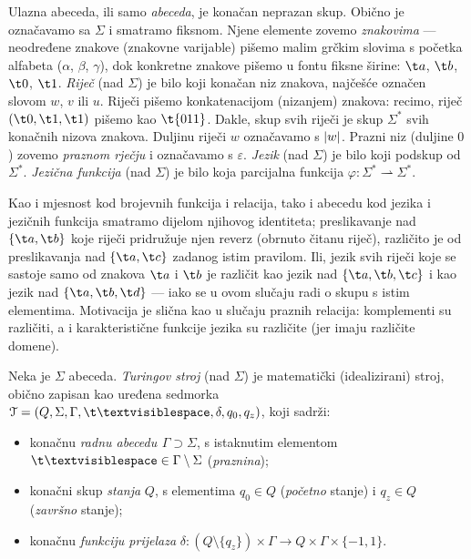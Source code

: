 Ulazna abeceda, ili samo \emph{abeceda}, je konačan neprazan skup. Obično je označavamo sa $\Sigma$ i smatramo fiksnom. Njene elemente zovemo \emph{znakovima} --- ne\-od\-re\-đe\-ne znakove (znakovne varijable) pišemo malim grčkim slovima s početka alfabeta ($\alpha$, $\beta$, $\gamma$), dok konkretne znakove pišemo u fontu fiksne širine: $\t a$, $\t b$, $\t 0$, $\t 1$. \emph{Riječ} (nad $\Sigma$) je bilo koji konačan niz znakova, najčešće označen slovom $w$, $v$ ili $u$. Riječi pišemo konkatenacijom (nizanjem) znakova: recimo, riječ $(\t0,\t1,\t1)$ pišemo kao $\t{011}$. Dakle, skup svih riječi je skup $\Sigma^*$ svih konačnih nizova znakova. Duljinu riječi $w$ označavamo s $\lvert w\rvert$. Prazni niz (duljine $0$) zovemo \emph{praznom rječju} i označavamo s $\varepsilon$. \emph{Jezik} (nad $\Sigma$) je bilo koji podskup od $\Sigma^*$. \emph{Jezična funkcija} (nad $\Sigma$) je bilo koja parcijalna funkcija $\varphi:\Sigma^*\rightharpoonup\Sigma^*$.

\begin{napomena}[{name=[abeceda je dio identiteta jezične funkcije]}]
Kao i mjesnost kod brojevnih funkcija i relacija, tako i abecedu kod jezika i jezičnih funkcija smatramo dijelom njihovog identiteta; preslikavanje nad $\{\t a,\t b\}$ koje riječi pridružuje njen reverz (obrnuto čitanu riječ), različito je od preslikavanja nad $\{\t a,\t c\}$ zadanog istim pravilom. Ili, jezik svih riječi koje se sastoje samo od znakova $\t a$ i $\t b$ je različit kao jezik nad $\{\t a,\t b,\t c\}$ i kao jezik nad $\{\t a,\t b,\t d\}$ --- iako se u ovom slučaju radi o skupu s istim elementima. Motivacija je slična kao u slučaju praznih relacija: komplementi su različiti, a i karakteristične funkcije jezika su različite (jer imaju različite domene).
\end{napomena}

\begin{definicija}[{name=[Turingov stroj]}]
Neka je $\Sigma$ abeceda. \emph{Turingov stroj} (nad $\Sigma$) je matematički (idealizirani) stroj, obično zapisan kao uređena sedmorka $\mathcal T=(Q,\Sigma,\Gamma,\bl,\delta,q_0,q_z)$, koji sadrži:
\begin{itemize}
\item konačnu \emph{radnu abecedu} $\mspace{1mu}\Gamma\supset\Sigma$, s istaknutim elementom $\bl\in\Gamma\setminus\Sigma$ (\emph{praznina});
    \item konačni skup \emph{stanja} $Q$, s elementima $q_0\in Q$ (\emph{početno} stanje) i $q_z\in Q$ (\emph{završno} stanje);
    \item konačnu \emph{funkciju prijelaza} $\delta:(Q\setminus\{q_z\})\times\Gamma\to Q\times\Gamma\times\{-1,1\}$.\qedhere
\end{itemize}
\end{definicija}

